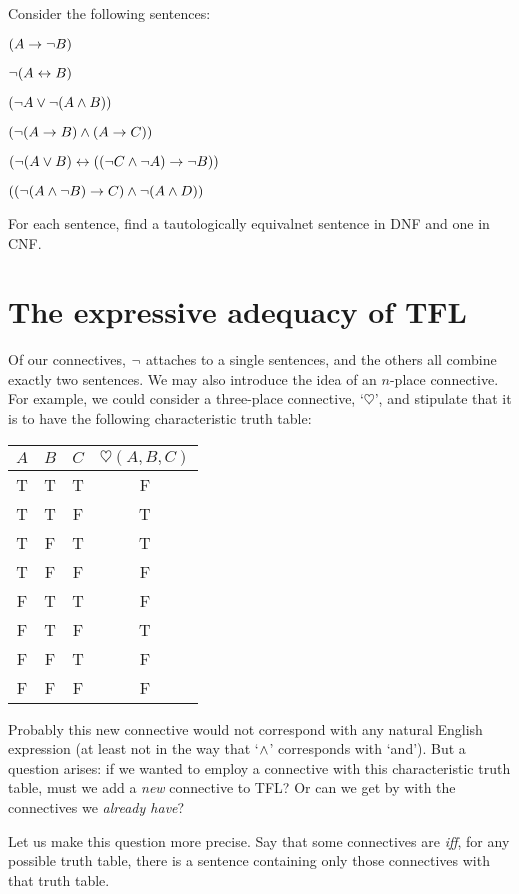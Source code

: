 \practiceproblems
\problempart
\label{pr.DNF}
Consider the following sentences:
	\begin{earg}
		\item $(A \rightarrow \neg B)$
		\item $\neg (A \leftrightarrow B)$
		\item $(\neg A \vee \neg (A \wedge B))$
		\item $(\neg (A \rightarrow B ) \wedge (A \rightarrow C))$
		\item $(\neg (A \vee B) \leftrightarrow ((\neg C \wedge \neg A) \rightarrow \neg B))$
		\item $((\neg (A \wedge \neg B) \rightarrow C) \wedge \neg (A \wedge D))$
	\end{earg}
        For each sentence, find a tautologically equivalnet sentence in DNF and one in CNF.
        
\section{The expressive adequacy of TFL}

Of our connectives, $\neg$ attaches to a single sentences, and the others all combine exactly two sentences. We may also introduce the idea of an $n$-place connective. For example, we could consider a three-place connective, `$\heartsuit$', and stipulate that it is to have the following characteristic truth table:
\begin{center}
\begin{tabular}{c c c | c}
$A$ & $B$ & $C$ & $\heartsuit(A,B,C)$\\
\hline
 T & T & T & F \\
 T & T & F & T \\
 T & F & T & T \\
 T & F & F & F \\
 F & T & T & F \\
 F & T & F & T \\
 F & F & T & F \\
 F & F & F & F
\end{tabular}
\end{center}
Probably this new connective would not correspond with any natural English expression (at least not in the way that `$\wedge$' corresponds with `and'). But a question arises: if we wanted to employ a connective with this characteristic truth table, must we add a \emph{new} connective to TFL? Or can we get by with the connectives we \emph{already have}?

Let us make this question more precise. Say that some connectives are  \emph{iff}, for any possible truth table, there is a sentence containing only those connectives with that truth table.

